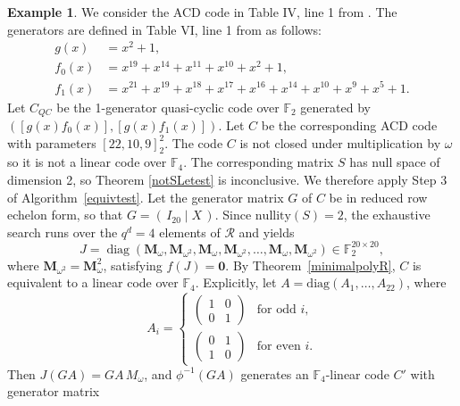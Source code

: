 \documentclass[a4paper,12pt]{article}
\theoremstyle{plain}
\theoremstyle{definition}
\newtheorem{example}{Example}
\begin{document}
\begin{example} \label{exampleACD}
 We consider the ACD code in Table IV, line 1 from \cite{guan2023}. The generators are defined in Table VI, line 1 from \cite{guan2023} as follows: 
\[
\begin{aligned}
g(x) &= x^{2} + 1, \\
f_{0}(x) &= x^{19} + x^{14} + x^{11} + x^{10} + x^{2} + 1, \\
f_{1}(x) &= x^{21} + x^{19} + x^{18} + x^{17} + x^{16} + x^{14} + x^{10} + x^{9} + x^{5} + 1.
\end{aligned}
\]
Let $C_{QC}$ be the 1-generator quasi-cyclic code over $\mathbb{F}_2$ generated by $([g(x)f_0(x)], [g(x)f_1(x)])$. Let $C$ be the corresponding ACD code with parameters $[22, 10, 9]^2_2$. The code $C$ is not closed under multiplication by $\omega$ so it is not a linear code over $\mathbb{F}_{4}$. The corresponding matrix $S$ has null space of dimension 2, so Theorem \ref{notSLetest} is inconclusive. 
We therefore apply Step 3 of Algorithm~\ref{equivtest}. 
Let the generator matrix $G$ of $C$ be in reduced row echelon form, so that $G = (\,I_{20} \mid X\,)$. Since $\mathrm{nullity}(S) = 2$, the exhaustive search runs over the $q^d = 4$ elements of $\mathcal{R}$ and yields
\[
J = \operatorname{diag}(\mathbf{M}_\omega, \mathbf{M}_{\omega^2}, 
\mathbf{M}_\omega, \mathbf{M}_{\omega^2}, \dots, 
\mathbf{M}_\omega, \mathbf{M}_{\omega^2}) \in \mathbb{F}_2^{20 \times 20},
\]
where $\mathbf{M}_{\omega^2} = \mathbf{M}_\omega^2$, satisfying $f(J) = \mathbf{0}$. By Theorem~\ref{minimalpolyR}, $C$ is equivalent to a linear code over $\mathbb{F}_4$. 
Explicitly, let $A = \mathrm{diag}(A_1, \dots, A_{22})$, where 
$$
A_i = \begin{cases}
\begin{pmatrix} 1 & 0 \\ 0 & 1 \end{pmatrix} & \text{for odd } i, \\[10pt]
\begin{pmatrix} 0 & 1 \\ 1 & 0 \end{pmatrix} & \text{for even } i.
\end{cases}
$$ 
Then $J(GA) = GA\,M_\omega$, and $\phi^{-1}(GA)$ generates an $\mathbb{F}_4$-linear code  $C'$
with generator matrix


\end{example}
\end{document}
